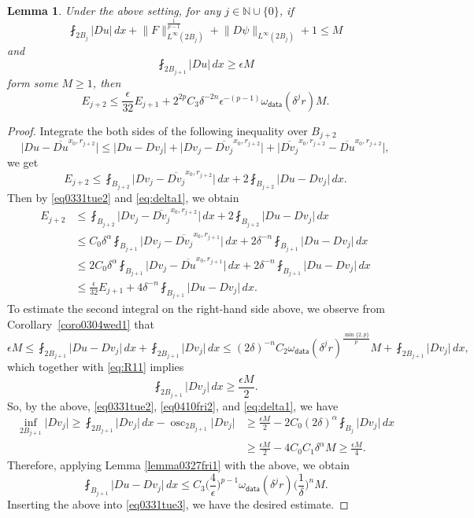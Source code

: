 \documentclass[reqno]{amsart}
\numberwithin{equation}{section}
\theoremstyle{plain}
\newtheorem{lemma}[theorem]{Lemma}
\theoremstyle{definition}
\theoremstyle{remark}
\DeclareMathOperator{\osc}{osc}
\providecommand{\set}[1]{\{#1\}}
\providecommand{\abs}[1]{\lvert#1\rvert}
\providecommand{\norm}[1]{\lVert#1\rVert}
\begin{document}
\begin{lemma}\label{lemma0331tue1}
Under the above setting, for any $j\in \mathbb{N}\cup\{0\}$, if
\[
\fint_{2B_j}\abs{Du} \, dx +  \norm{F}_{L^\infty(2B_j)}
^{\frac{1}{p-1}}+\norm{D\psi}_{L^\infty(2B_j)} +1\leq M
\]
and
\[
\fint_{2B_{j+1}}\abs{Du}\, dx\geq \epsilon M
\]
form some $M\geq1$, then
\[
E_{j+2}\leq \frac{\epsilon}{32} E_{j+1} +2^{2p}C_3\delta^{-2n} \epsilon^{-(p-1)}\omega_{\mathsf{data}}(\delta^j r)   M.
\]
 
\end{lemma}
\begin{proof}
Integrate the both sides of the following inequality over $B_{j+2}$
\[
\abs{Du-\overline{Du}^{x_0,r_{j+2} }}\leq \abs{Du-Dv_j}+\abs{ Dv_j- \overline{Dv_j}^{x_0,r_{j+2}}}+\abs{  \overline{Dv_j}^{x_0,r_{j+2}}-\overline{Du}^{x_0,r_{j+2} }},
\]
we get 
\[
E_{j+2}\leq \fint_{B_{j+2} } \abs{ Dv_j- \overline{Dv_j}^{x_0,r_{j+2}}} \,dx +2 \fint_{B_{j+2} }   \abs{Du-Dv_j}\,dx.
\]
Then by \eqref{eq0331tue2} and \eqref{eq:delta1}, we obtain
\begin{equation} \label{eq0331tue3}
\begin{aligned}
E_{j+2}&\leq \fint_{B_{j+2} } \abs{ Dv_j- \overline{Dv_j}^{x_0,r_{j+2}}} \,dx +2 \fint_{B_{j+2} }   \abs{Du-Dv_j}\,dx\\
&\leq C_0 \delta^\alpha \fint_{B_{j+1} } \abs{ Dv_j- \overline{Dv_j}^{x_0,r_{j+1}}} \,dx +2\delta^{-n} \fint_{B_{j+1} }   \abs{Du-Dv_j}\, dx\\
&\leq 2C_0 \delta^\alpha \fint_{B_{j+1} } \abs{ Dv_j- \overline{Du}^{x_0,r_{j+1}}} \,dx +2\delta^{-n} \fint_{B_{j+1} }   \abs{Du-Dv_j}\, dx\\
&\leq \frac{\epsilon}{32} E_{j+1}+4\delta^{-n}  \fint_{B_{j+1} }   \abs{Du-Dv_j}\,dx.
\end{aligned}
\end{equation}
To estimate the second integral on the right-hand side above, we observe from Corollary~\ref{coro0304wed1} that
\[
\epsilon  M\leq  \fint_{2B_{j+1}}\abs{Du-Dv_j}\, dx +\fint_{2B_{j+1}}\abs{Dv_j}\, dx\leq (2\delta)^{-n} C_2 \omega_{\mathsf{data}}(\delta^j r)^{\frac{\min\set{2,p}}{p}}M +\fint_{2B_{j+1}}\abs{Dv_j}\,dx,
\]
which together with \eqref{eq:R11} implies 
\[
\fint_{2B_{j+1}}\abs{Dv_j}\, dx \geq \frac{\epsilon M}{2}.
\]
So, by the above,  \eqref{eq0331tue2}, \eqref{eq0410fri2}, and \eqref{eq:delta1},  we have 
\begin{align*}
\inf_{2B_{j+1}}\abs{ Dv_j}
 \geq \fint_{2B_{j+1}}\abs{Dv_j}\, dx -\osc_{2B_{j+1}} \abs{Dv_j} 
&\geq \frac{\epsilon M}{2} -2C_0(2\delta)^{\alpha} \fint_{B_{j}} \abs{Dv_j}\, dx\\
& \geq \frac{\epsilon M}{2} -4 C_0 C_1 \delta^{\alpha}M  \ge \frac{\epsilon M}{4}.
\end{align*}
Therefore, applying Lemma \ref{lemma0327fri1} with the above, we obtain
\[
 \fint_{B_{j+1}}\abs{Du-Dv_j} \,dx\leq C_3 \bigg( \frac{4}{\epsilon}\bigg)^{p-1} \omega_{\mathsf{data}}(\delta^j r)    \bigg(\frac{1}{\delta}\bigg)^n M.
\]
Inserting the above into \eqref{eq0331tue3}, we have the desired estimate.
\end{proof}
\end{document}
